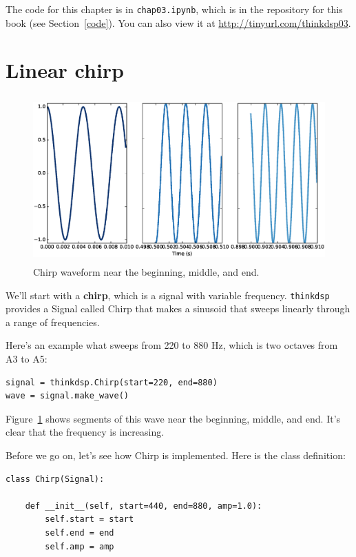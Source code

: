 \documentclass[12pt]{book}
\begin{document}
The code for this chapter is in {\tt chap03.ipynb}, which is in the
repository for this book (see Section~\ref{code}).
You can also view it at \url{http://tinyurl.com/thinkdsp03}.


\section{Linear chirp}

\begin{figure}
\centerline{\includegraphics[height=2.5in]{figs/chirp3.eps}}
\caption{Chirp waveform near the beginning, middle, and end.}
\label{fig.chirp3}
\end{figure}

We'll start with a {\bf chirp}, which is a signal with variable
frequency.  {\tt thinkdsp} provides a Signal called Chirp that
makes a sinusoid that sweeps linearly through a range of
frequencies.

Here's an example what sweeps from 220 to 880 Hz, which
is two octaves from A3 to A5:

\begin{verbatim}
signal = thinkdsp.Chirp(start=220, end=880)
wave = signal.make_wave()
\end{verbatim}

Figure~\ref{fig.chirp3} shows segments of this wave near the
beginning, middle, and end.  It's clear that the frequency is
increasing.

Before we go on, let's see how Chirp is implemented.  Here
is the class definition:

\begin{verbatim}
class Chirp(Signal):
    
    def __init__(self, start=440, end=880, amp=1.0):
        self.start = start
        self.end = end
        self.amp = amp
\end{verbatim}
\end{document}
